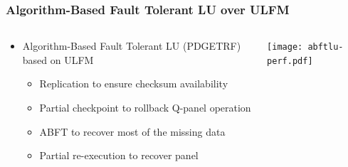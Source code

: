 \begin{frame}
  \frametitle{Algorithm-Based Fault Tolerant LU over ULFM}

  \begin{columns}
    \begin{column}{.3\textwidth}
      \begin{itemize}
      \item Algorithm-Based Fault Tolerant LU (PDGETRF) based on ULFM
        \begin{itemize}
        \item Replication to ensure checksum availability
        \item Partial checkpoint to rollback Q-panel operation
        \item ABFT to recover most of the missing data
        \item Partial re-execution to recover panel
        \end{itemize}
      \end{itemize}
    \end{column}
    \begin{column}{.7\textwidth}
        \begin{center}
          \texttt{[image: abftlu-perf.pdf]}
        \end{center}
    \end{column}
  \end{columns}
\end{frame}

